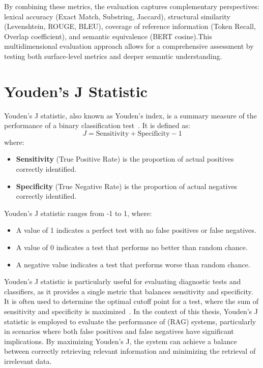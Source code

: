 By combining these metrics, the evaluation captures complementary perspectives:  
lexical accuracy (Exact Match, Substring, Jaccard), structural similarity (Levenshtein, ROUGE, BLEU), coverage of reference information (Token Recall, Overlap coefficient), and semantic equivalence (\gls{BERT} cosine).This multidimensional evaluation approach allows for a comprehensive assessment by testing both surface-level metrics and deeper semantic understanding.

\section{Youden's J Statistic}
\label{sec:youden}
Youden's J statistic, also known as Youden's index, is a summary measure of the performance of a binary classification test~\cite{youden1950index}. It is defined as:
\[
J = \text{Sensitivity} + \text{Specificity} - 1
\]
where:
\begin{itemize}
    \item \textbf{Sensitivity} (True Positive Rate) is the proportion of actual positives correctly identified.
    \item \textbf{Specificity} (True Negative Rate) is the proportion of actual negatives correctly identified.
\end{itemize}
Youden's J statistic ranges from -1 to 1, where:
\begin{itemize}
    \item A value of 1 indicates a perfect test with no false positives or false negatives.
    \item A value of 0 indicates a test that performs no better than random chance.
    \item A negative value indicates a test that performs worse than random chance.
\end{itemize}
Youden's J statistic is particularly useful for evaluating diagnostic tests and classifiers, as it provides a single metric that balances sensitivity and specificity. It is often used to determine the optimal cutoff point for a test, where the sum of sensitivity and specificity is maximized~\cite{fluss2005youden}.
In the context of this thesis, Youden's J statistic is employed to evaluate the performance of (\gls{RAG}) systems, particularly in scenarios where both false positives and false negatives have significant implications. By maximizing Youden's J, the system can achieve a balance between correctly retrieving relevant information and minimizing the retrieval of irrelevant data.
